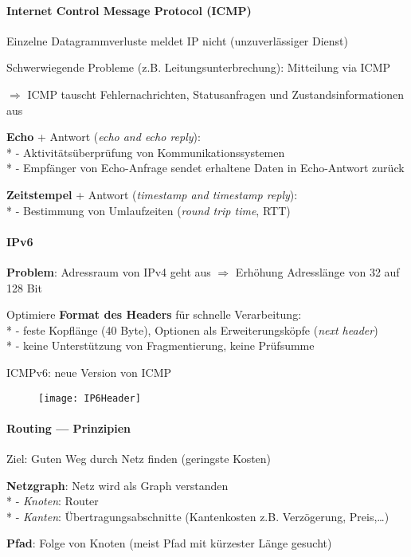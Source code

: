 \paragraph{Internet Control Message Protocol (ICMP)}
\begin{items}
  \item Einzelne Datagrammverluste meldet IP nicht (unzuverlässiger Dienst)
  \item Schwerwiegende Probleme (z.B. Leitungsunterbrechung): Mitteilung via ICMP
  \item \( \Rightarrow \) ICMP tauscht Fehlernachrichten, Statusanfragen und Zustandsinformationen aus
  \medskip
  \item \textbf{Echo} + Antwort (\emph{echo and echo reply}): \\*
    - Aktivitätsüberprüfung von Kommunikationssystemen \\*
    - Empfänger von Echo-Anfrage sendet erhaltene Daten in Echo-Antwort zurück
  \item \textbf{Zeitstempel} + Antwort (\emph{timestamp and timestamp reply}): \\*
    - Bestimmung von Umlaufzeiten (\emph{round trip time}, RTT)
\end{items}

\paragraph{IPv6}
\begin{items}
  \item \textbf{Problem}: Adressraum von IPv4 geht aus \( \Rightarrow \) Erhöhung Adresslänge von 32 auf 128 Bit 
  \item Optimiere \textbf{Format des Headers} für schnelle Verarbeitung:\\*
    - feste Kopflänge (40 Byte), Optionen als Erweiterungsköpfe (\emph{next header}) \\*
    - keine Unterstützung von Fragmentierung, keine Prüfsumme
   \item ICMPv6: neue Version von ICMP
    \begin{figure}[H]\centering\texttt{[image: IP6Header]}\end{figure}
\end{items}

\paragraph{Routing --- Prinzipien}
\begin{items}
  \item Ziel: Guten Weg durch Netz finden (geringste Kosten)
  \item \textbf{Netzgraph}: Netz wird als Graph verstanden \\*
    - \emph{Knoten}: Router \\*
    - \emph{Kanten}: Übertragungsabschnitte (Kantenkosten z.B. Verzögerung, Preis,\dots)
  \item \textbf{Pfad}: Folge von Knoten (meist Pfad mit kürzester Länge gesucht)
\end{items}

